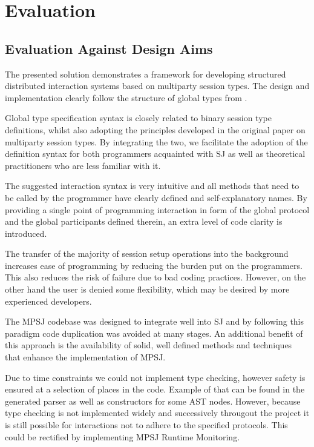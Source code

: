 \cleardoublepage
\chapter{Evaluation}
\label{ch:evaluation}

\section{Evaluation Against Design Aims} 

The presented solution demonstrates a framework for developing structured distributed interaction systems based on multiparty session types. The design and implementation clearly follow the structure of global types from \cite{multiparty_sess_types}.

Global type specification syntax is closely related to binary session type definitions, whilst also adopting the principles developed in the original paper on multiparty session types. By integrating the two, we facilitate the adoption of the definition syntax for both programmers acquainted with SJ as well as theoretical practitioners who are less familiar with it. 

The suggested interaction syntax is very intuitive and all methods that need to be called by the programmer have clearly defined and self-explanatory names. By providing a single point of programming interaction in form of the global protocol and the global participants defined therein, an extra level of code clarity is introduced.

The transfer of the majority of session setup operations into the background increases ease of programming by reducing the burden put on the programmers. This also reduces the risk of failure due to bad coding practices. However, on the other hand the user is denied some flexibility, which may be desired by more experienced developers.

The MPSJ codebase was designed to integrate well into SJ and by following this paradigm code duplication was avoided at many stages. An additional benefit of this approach is the availability of solid, well defined methods and techniques that enhance the implementation of MPSJ.

Due to time constraints we could not implement type checking, however safety is ensured at a selection of places in the code. Example of that can be found in the generated parser as well as constructors for some AST nodes. However, because type checking is not implemented widely and successively througout the project it is still possible for interactions not to adhere to the specified protocols. This could be rectified by implementing MPSJ Runtime Monitoring.

